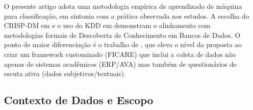 \documentclass[english, spanish, brazilian]{RBIEarticle} %
\begin{document}
O presente artigo adota uma metodologia empírica de aprendizado de máquina para classificação, em sintonia com a prática observada nos estudos. A escolha do CRISP-DM em \cite{jesus2024mapeamento} e o uso do KDD em \cite{ramos2018comparativo} demonstram o alinhamento com metodologias formais de Descoberta de Conhecimento em Bancos de Dados. O ponto de maior diferenciação é o trabalho de \cite{neves2024ficare}, que eleva o nível da proposta ao criar um framework customizado (FICARE) que inclui a coleta de dados não apenas de sistemas acadêmicos (ERP/AVA) mas também de questionários de escuta ativa (dados subjetivos/textuais).

\newpage
\subsection{Contexto de Dados e Escopo}
\end{document}
